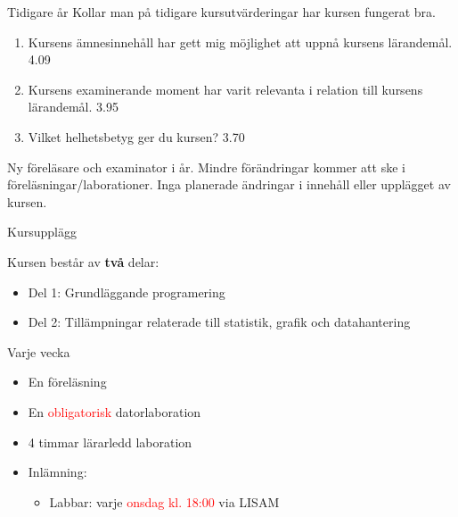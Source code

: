 \documentclass[
  10pt,
  ignorenonframetext,
]{beamer}
\providecommand{\tightlist}{%
  \setlength{\itemsep}{0pt}\setlength{\parskip}{0pt}}
\begin{document}
\begin{frame}{Tidigare år}
\protect\hypertarget{tidigare-uxe5r}{}
Kollar man på tidigare kursutvärderingar har kursen fungerat bra.

\begin{enumerate}
\tightlist
\item
  Kursens ämnesinnehåll har gett mig möjlighet att uppnå kursens
  lärandemål. 4.09
\item
  Kursens examinerande moment har varit relevanta i relation till
  kursens lärandemål. 3.95
\item
  Vilket helhetsbetyg ger du kursen? 3.70
\end{enumerate}

Ny föreläsare och examinator i år. Mindre förändringar kommer att ske i
föreläsningar/laborationer. Inga planerade ändringar i innehåll eller
upplägget av kursen.
\end{frame}

\begin{frame}{Kursupplägg}
\protect\hypertarget{kursuppluxe4gg}{}
\begin{block}{Kursen består av \textbf{två} delar:}
\protect\hypertarget{kursen-bestuxe5r-av-tvuxe5-delar}{}
\begin{itemize}
\tightlist
\item
  Del 1: Grundläggande programering
\item
  Del 2: Tillämpningar relaterade till statistik, grafik och
  datahantering
\end{itemize}

\pause
\end{block}

\begin{block}{Varje vecka}
\protect\hypertarget{varje-vecka}{}
\begin{itemize}
\tightlist
\item
  En föreläsning
\item
  En \textcolor{red}{obligatorisk} datorlaboration
\item
  4 timmar lärarledd laboration
\item
  Inlämning:

  \begin{itemize}
  \tightlist
  \item
    Labbar: varje \textcolor{red}{onsdag kl. 18:00} via LISAM
  \end{itemize}
\end{itemize}
\end{block}
\end{frame}
\end{document}
